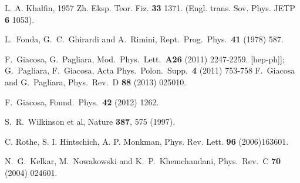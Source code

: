 \documentclass[12pt]{article}%
\begin{document}
%


\begin{thebibliography}{99}                                                                                               %


L. A. Khalfin, 1957 Zh. Eksp. Teor. Fiz. \textbf{33} 1371.
(Engl. trans. Sov. Phys. JETP \textbf{6} 1053).

L.~Fonda, G.~C.~Ghirardi and A.~Rimini,
Rept.\ Prog.\ Phys.\ \textbf{41} (1978) 587.


F.~Giacosa, G.~Pagliara,
Mod.\ Phys.\ Lett.\ \textbf{A26 } (2011) 2247-2259.
[hep-ph]];
G.~Pagliara, F.~Giacosa,
Acta Phys.\ Polon.\ Supp.\ \textbf{4 } (2011) 753-758
F.~Giacosa and G.~Pagliara,
Phys.\ Rev.\ D \textbf{88} (2013) 025010.


F.~Giacosa,
Found.\ Phys.\ \textbf{42} (2012) 1262.


S.~R.~Wilkinson et al, Nature \textbf{387}, 575 (1997).


C. Rothe, S. I. Hintschich, A. P. Monkman, Phys. Rev. Lett.
\textbf{96} (2006)163601.

N.~G.~Kelkar, M.~Nowakowski and K.~P.~Khemchandani,
Phys.\ Rev.\ C \textbf{70} (2004) 024601.



\end{thebibliography}
\end{document}
